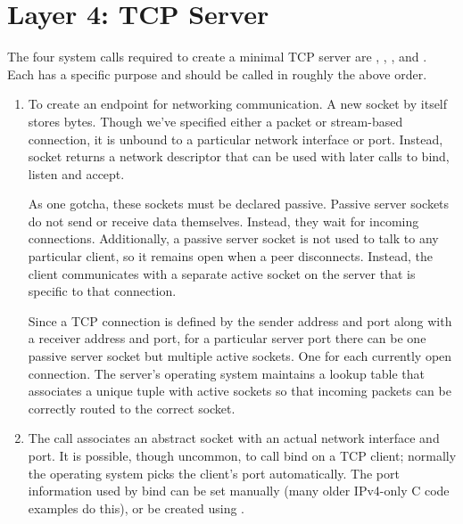 \section{Layer 4: TCP Server}

The four system calls required to create a minimal TCP server are , , , and .
Each has a specific purpose and should be called in roughly the above order.

\begin{enumerate}

  \item {}

  To create an endpoint for networking communication.
  A new socket by itself stores bytes.
  Though we've specified either a packet or stream-based connection, it is unbound to a particular network interface or port.
  Instead, socket returns a network descriptor that can be used with later calls to bind, listen and accept.

  As one gotcha, these sockets must be declared passive.
  Passive server sockets do not send or receive data themselves.
  Instead, they wait for incoming connections.
  Additionally, a passive server socket is not used to talk to any particular client, so it remains open when a peer disconnects.
  Instead, the client communicates with a separate active socket on the server that is specific to that connection.

  Since a TCP connection is defined by the sender address and port along with a receiver address and port, for a particular server port there can be one passive server socket but multiple active sockets.
  One for each currently open connection.
  The server's operating system maintains a lookup table that associates a unique tuple with active sockets so that incoming packets can be correctly routed to the correct socket.

  \item {}

  The  call associates an abstract socket with an actual network interface and port.
  It is possible, though uncommon, to call bind on a TCP client; normally the operating system picks the client's port automatically.
  The port information used by bind can be set manually (many older IPv4-only C code examples do this), or be created using .


\end{enumerate}
